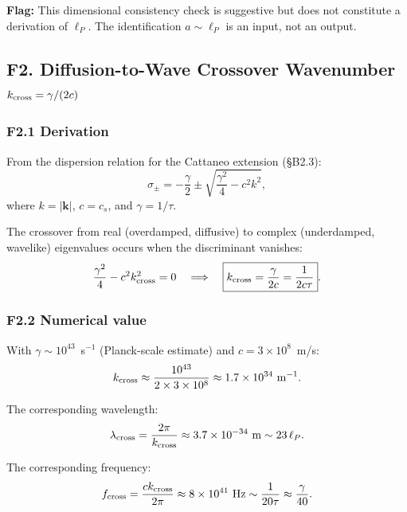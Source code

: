 \documentclass[reprint]{revtex4-2}
\begin{document}
\textbf{Flag:} This dimensional consistency check is suggestive but does not constitute a derivation of $\ell_P$. The identification $a\sim\ell_P$ is an input, not an output.

\subsection{F2. Diffusion-to-Wave Crossover Wavenumber $k_{\rm cross} = \gamma/(2c)$}

\subsubsection{F2.1 Derivation}

From the dispersion relation for the Cattaneo extension (\S B2.3):
\begin{equation}
\sigma_\pm = -\frac{\gamma}{2} \pm \sqrt{\frac{\gamma^2}{4} - c^2 k^2},
\end{equation}
where $k = |\mathbf{k}|$, $c = c_s$, and $\gamma = 1/\tau$.

The crossover from real (overdamped, diffusive) to complex (underdamped, wavelike) eigenvalues occurs when the discriminant vanishes:
\begin{equation}
\frac{\gamma^2}{4} - c^2 k_{\rm cross}^2 = 0 \quad\Longrightarrow\quad \boxed{k_{\rm cross} = \frac{\gamma}{2c} = \frac{1}{2c\tau}}.
\label{eq:kcross}
\end{equation}

\subsubsection{F2.2 Numerical value}

With $\gamma \sim 10^{43}$~s$^{-1}$ (Planck-scale estimate) and $c = 3\times 10^8$~m/s:
\begin{equation}
k_{\rm cross} \approx \frac{10^{43}}{2\times 3\times 10^8} \approx 1.7\times 10^{34}~\text{m}^{-1}.
\end{equation}

The corresponding wavelength:
\begin{equation}
\lambda_{\rm cross} = \frac{2\pi}{k_{\rm cross}} \approx 3.7\times 10^{-34}~\text{m} \sim 23\,\ell_P.
\end{equation}

The corresponding frequency:
\begin{equation}
f_{\rm cross} = \frac{ck_{\rm cross}}{2\pi} \approx 8\times 10^{41}~\text{Hz} \sim \frac{1}{20\tau} \approx \frac{\gamma}{40}.
\end{equation}
\end{document}
